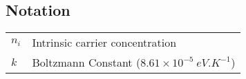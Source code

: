 \subsection{Notation}
\begin{tabular}{ l l }
$n_i$&Intrinsic carrier concentration\\
$k$&Boltzmann Constant ($8.61\times 10^{-5}~eV.K^{-1}$)
\end{tabular}
